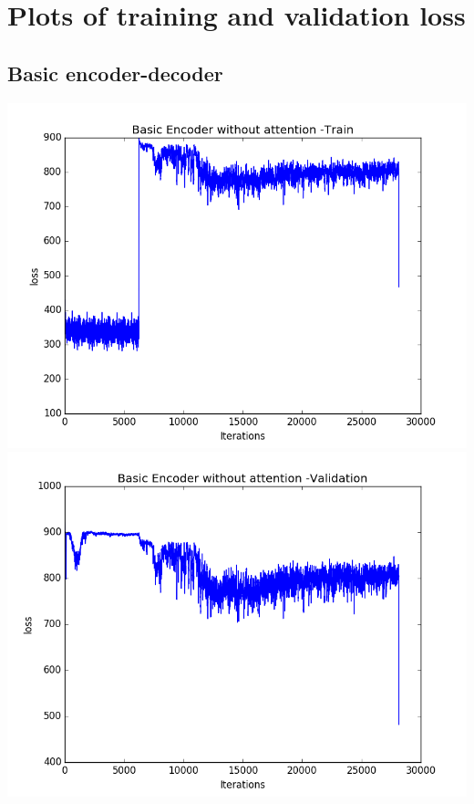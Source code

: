 \documentclass[12pt]{report}
\begin{document}
\section{Plots of training and validation loss}

\subsection{Basic encoder-decoder}
\begin{center}
\includegraphics[scale=0.5]{train_basic.png}
\includegraphics[scale=0.5]{val_basic.png}
\end{center}
\end{document}
